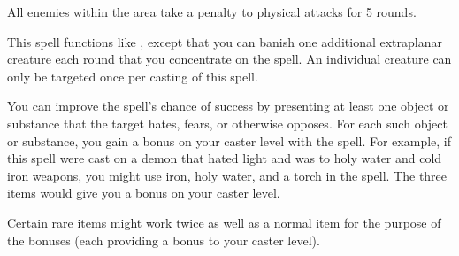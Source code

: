 \begin{comment}
\subsubsection{B}
\end{comment}

\begin{spelleffect}
  All enemies within the area take a  penalty to physical attacks for 5 rounds.
\end{spelleffect}

\spellrng{\rngmed}
\begin{spelleffect}
  This spell functions like , except that you can banish one additional extraplanar creature each round that you concentrate on the spell. An individual creature can only be targeted once per casting of this spell.
\end{spelleffect}
\begin{spellnotes}
  You can improve the spell's chance of success by presenting at least one object or substance that the target hates, fears, or otherwise opposes. For each such object or substance, you gain a  bonus on your caster level with the spell. For example, if this spell were cast on a demon that hated light and was \vulnerable to holy water and cold iron weapons, you might use iron, holy water, and a torch in the spell. The three items would give you a  bonus on your caster level. 
  \par Certain rare items might work twice as well as a normal item for the purpose of the bonuses (each providing a  bonus to your caster level).
\end{spellnotes}

